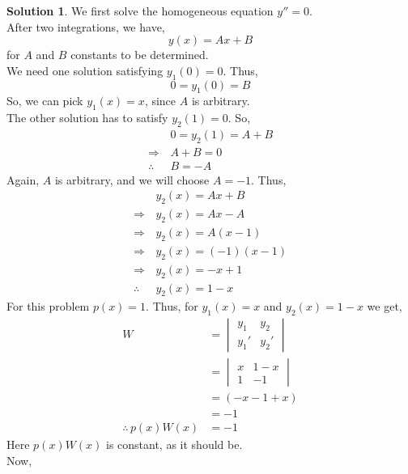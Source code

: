 \documentclass[12pt,a4paper]{article}
\theoremstyle{remark}
\theoremstyle{definition}
\newtheorem*{soln}{Solution}
\begin{document}
\begin{soln}
    We first solve the homogeneous equation $ y''=0$.\\
    After two integrations, we have,
    \[
        y(x)=Ax+B
    \]
    for $ A $ and $ B $ constants to be determined.\\
    We need one solution satisfying $ y_1(0)=0 $. Thus,
    \[
        0=y_1(0)=B
    \]
    So, we can pick $ y_1(x)=x $, since $ A $ is arbitrary.\\
    The other solution has to satisfy $ y_2(1)=0 $. So,
    \begin{align*}
                      & 0=y_2(1)=A+B \\
        \Rightarrow\, & A+B=0        \\
        \therefore\,  & B=-A
    \end{align*}
    Again, $ A $ is arbitrary, and we will choose $ A=-1 $. Thus,
    \begin{align*}
                      & y_2(x)=Ax+B      \\
        \Rightarrow\, & y_2(x)=Ax-A      \\
        \Rightarrow\, & y_2(x)=A(x-1)    \\
        \Rightarrow\, & y_2(x)=(-1)(x-1) \\
        \Rightarrow\, & y_2(x)=-x+1      \\
        \therefore\,  & y_2(x)=1-x
    \end{align*}
    For this problem $ p(x)=1 $. Thus, for $ y_1(x)=x $ and $ y_2(x)=1-x $ we get,
    \begin{align*}
        W                    & =\begin{vmatrix}
            y_1  & y_2  \\
            y_1' & y_2'
        \end{vmatrix} \\
                             & =\begin{vmatrix}
            x & 1-x \\
            1 & -1
        \end{vmatrix} \\
                             & =(-x-1+x)                   \\
                             & =-1                         \\
        \therefore\,p(x)W(x) & =-1
    \end{align*}
    Here $ p(x)W(x) $ is constant, as it should be.\\
    Now,

\end{soln}
\end{document}
